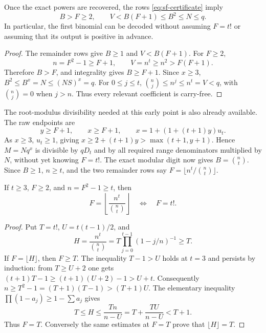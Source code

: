 \begin{lemma}\label{lem:sf-bootstrap}
Once the exact powers are recovered, the rows
\eqref{eq:sf-certificate} imply
\[
 B>F\ge2,\qquad V<B(F+1)\le B^2\le N\le q.
\]
In particular, the first binomial can be decoded without assuming
\(F=t!\) or assuming that its output is positive in advance.
\end{lemma}
\begin{proof}
The remainder rows give \(B\ge1\) and \(V<B(F+1)\).
For \(F\ge2\),
\[
 n=F^2-1\ge F+1,\qquad V=n^t\ge n^2>F(F+1).
\]
Therefore \(B>F\), and integrality gives \(B\ge F+1\).
Since \(x\ge3\), \(B^2\le B^x=N\le(NS)^x=q\).
For \(0\le j\le t\),
\(\binom nj\le n^j\le n^t=V<q\), with \(\binom nj=0\) when
\(j>n\). Thus every relevant coefficient is carry-free.
\end{proof}
The root-modulus divisibility needed at this early point is also already
available. The raw endpoints are
\[
 y\ge F+1,\qquad x\ge F+1,\qquad
 x=1+(1+(t+1)y)u_t.
\]
As \(x\ge3\), \(u_t\ge1\), giving
\(x\ge2+(t+1)y>\max(t+1,y+1)\). Hence
\(M=Nq^x\) is divisible by \(qD_t\) and by all required range
denominators multiplied by \(N\), without yet knowing \(F=t!\).
The exact modular digit now gives \(B=\binom nt\). Since \(B\ge1\),
\(n\ge t\), and the two remainder rows say
\(F=\lfloor n^t/\binom nt\rfloor\).

\begin{lemma}\label{lem:sf-fixed}
If \(t\ge3\), \(F\ge2\), and \(n=F^2-1\ge t\), then
\[
 F=\left\lfloor\frac{n^t}{\binom nt}\right\rfloor
 \quad\Longleftrightarrow\quad F=t!.
\]
\end{lemma}
\begin{proof}
Put \(T=t!\), \(U=t(t-1)/2\), and
\[
 H=\frac{n^t}{\binom nt}
   =T\prod_{j=0}^{t-1}(1-j/n)^{-1}\ge T.
\]
If \(F=\lfloor H\rfloor\), then \(F\ge T\).
The inequality \(T-1>U\) holds at \(t=3\) and persists by induction:
from \(T\ge U+2\) one gets
\((t+1)T-1\ge(t+1)(U+2)-1>U+t\).
Consequently
\(n\ge T^2-1=(T+1)(T-1)>(T+1)U\).
The elementary inequality \(\prod(1-a_j)\ge1-\sum a_j\) gives
\[
 T\le H\le\frac{Tn}{n-U}
   =T+\frac{TU}{n-U}<T+1.
\]
Thus \(F=T\). Conversely the same estimates at \(F=T\) prove that
\(\lfloor H\rfloor=T\).
\end{proof}

